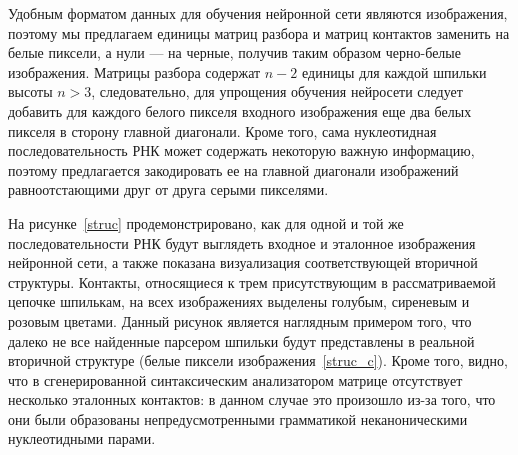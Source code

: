 Удобным форматом данных для обучения нейронной сети являются изображения, поэтому мы предлагаем  единицы матриц разбора и матриц контактов заменить на белые пиксели, а нули --- на черные, получив таким образом черно-белые изображения. Матрицы разбора содержат $n - 2$ единицы для каждой шпильки высоты $n>3$, следовательно, для упрощения обучения нейросети следует добавить для каждого белого пикселя входного изображения еще два белых пикселя в сторону главной диагонали. Кроме того, сама нуклеотидная последовательность РНК может содержать некоторую важную информацию, поэтому предлагается закодировать ее на главной диагонали изображений равноотстающими друг от друга серыми пикселями. 

На рисунке~\ref{struc} продемонстрировано, как для одной и той же последовательности РНК будут выглядеть входное и эталонное изображения нейронной сети, а также показана визуализация соответствующей вторичной структуры. Контакты, относящиеся к трем присутствующим в рассматриваемой цепочке шпилькам, на всех изображениях выделены голубым, сиреневым и розовым цветами. Данный рисунок является наглядным примером того, что далеко не все найденные парсером шпильки будут представлены в реальной вторичной структуре (белые пиксели изображения~\ref{struc_c}). Кроме того, видно, что в сгенерированной синтаксическим анализатором матрице отсутствует несколько эталонных контактов: в данном случае это произошло из-за того, что они были образованы непредусмотренными грамматикой неканоническими нуклеотидными парами. 

